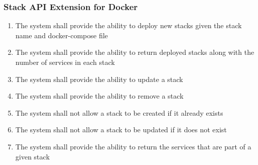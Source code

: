 \documentclass[]{article}
\begin{document}
\subsubsection{Stack API Extension for Docker}
\begin{enumerate}[label*=R3.\arabic*.]
	\item The system shall provide the ability to deploy new stacks given the stack name and docker-compose file
	\item The system shall provide the ability to return deployed stacks along with the number of services in each stack
	\item The system shall provide the ability to update a stack
	\item The system shall provide the ability to remove a stack
	\item The system shall not allow a stack to be created if it already exists
	\item The system shall not allow a stack to be updated if it does not exist
	\item The system shall provide the ability to return the services that are part of a given stack
\end{enumerate}
\end{document}
